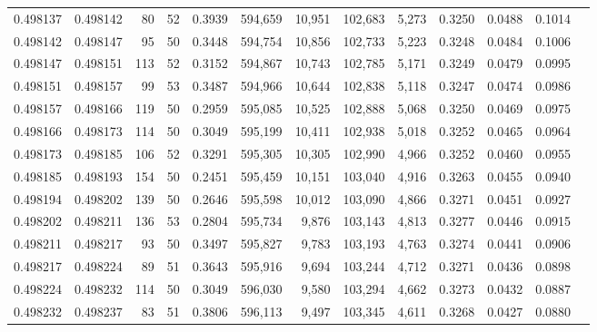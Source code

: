 \begin{tabular}{rrrrrrrrrrrrr}
0.498137 & 0.498142 &    80 &  52 &                                     0.3939 & 594,659 &  10,951 & 102,683 &   5,273 & 0.3250 & 0.0488 & 0.1014 \\
0.498142 & 0.498147 &    95 &  50 &                                     0.3448 & 594,754 &  10,856 & 102,733 &   5,223 & 0.3248 & 0.0484 & 0.1006 \\
0.498147 & 0.498151 &   113 &  52 &                                     0.3152 & 594,867 &  10,743 & 102,785 &   5,171 & 0.3249 & 0.0479 & 0.0995 \\
0.498151 & 0.498157 &    99 &  53 &                                     0.3487 & 594,966 &  10,644 & 102,838 &   5,118 & 0.3247 & 0.0474 & 0.0986 \\
0.498157 & 0.498166 &   119 &  50 &                                     0.2959 & 595,085 &  10,525 & 102,888 &   5,068 & 0.3250 & 0.0469 & 0.0975 \\
0.498166 & 0.498173 &   114 &  50 &                                     0.3049 & 595,199 &  10,411 & 102,938 &   5,018 & 0.3252 & 0.0465 & 0.0964 \\
0.498173 & 0.498185 &   106 &  52 &                                     0.3291 & 595,305 &  10,305 & 102,990 &   4,966 & 0.3252 & 0.0460 & 0.0955 \\
0.498185 & 0.498193 &   154 &  50 &                                     0.2451 & 595,459 &  10,151 & 103,040 &   4,916 & 0.3263 & 0.0455 & 0.0940 \\
0.498194 & 0.498202 &   139 &  50 &                                     0.2646 & 595,598 &  10,012 & 103,090 &   4,866 & 0.3271 & 0.0451 & 0.0927 \\
0.498202 & 0.498211 &   136 &  53 &                                     0.2804 & 595,734 &   9,876 & 103,143 &   4,813 & 0.3277 & 0.0446 & 0.0915 \\
0.498211 & 0.498217 &    93 &  50 &                                     0.3497 & 595,827 &   9,783 & 103,193 &   4,763 & 0.3274 & 0.0441 & 0.0906 \\
0.498217 & 0.498224 &    89 &  51 &                                     0.3643 & 595,916 &   9,694 & 103,244 &   4,712 & 0.3271 & 0.0436 & 0.0898 \\
0.498224 & 0.498232 &   114 &  50 &                                     0.3049 & 596,030 &   9,580 & 103,294 &   4,662 & 0.3273 & 0.0432 & 0.0887 \\
0.498232 & 0.498237 &    83 &  51 &                                     0.3806 & 596,113 &   9,497 & 103,345 &   4,611 & 0.3268 & 0.0427 & 0.0880 \\

\end{tabular}
